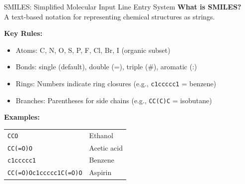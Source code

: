 \documentclass{beamer}
\begin{document}
\begin{frame}{SMILES: Simplified Molecular Input Line Entry System}
    \small
    \textbf{What is SMILES?}\\
    A text-based notation for representing chemical structures as strings.
    \vspace{0.5em}
    
    \textbf{Key Rules:}
    \begin{itemize}
        \item Atoms: C, N, O, S, P, F, Cl, Br, I (organic subset)
        \item Bonds: single (default), double (=), triple (\#), aromatic (:)
        \item Rings: Numbers indicate ring closures (e.g., \texttt{c1ccccc1} = benzene)
        \item Branches: Parentheses for side chains (e.g., \texttt{CC(C)C} = isobutane)
    \end{itemize}
    \vspace{0.3em}
    
    \textbf{Examples:}
    \begin{tabular}{ll}
        \texttt{CCO} & Ethanol \\
        \texttt{CC(=O)O} & Acetic acid \\
        \texttt{c1ccccc1} & Benzene \\
        \texttt{CC(=O)Oc1ccccc1C(=O)O} & Aspirin \\
    \end{tabular}
\end{frame}
\end{document}
